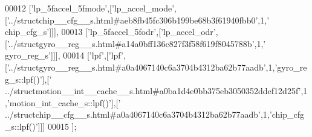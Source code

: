 \begin{DoxyCode}
00012   [\textcolor{stringliteral}{'lp\_5faccel\_5fmode'},[\textcolor{stringliteral}{'lp\_accel\_mode'},[\textcolor{stringliteral}{'../structchip\_\_cfg\_\_s.html#aeb8fb45fc306b199be68b3f61940fbb0'},1,\textcolor{stringliteral}{'
      chip\_cfg\_s'}]]],
00013   [\textcolor{stringliteral}{'lp\_5faccel\_5fodr'},[\textcolor{stringliteral}{'lp\_accel\_odr'},[\textcolor{stringliteral}{'../structgyro\_\_reg\_\_s.html#a14a0bff136c827f3f58f619f8045788b'},1,\textcolor{stringliteral}{'
      gyro\_reg\_s'}]]],
00014   [\textcolor{stringliteral}{'lpf'},[\textcolor{stringliteral}{'lpf'},[\textcolor{stringliteral}{'../structgyro\_\_reg\_\_s.html#a0a4067140c6a3704b4312ba62b77aadb'},1,\textcolor{stringliteral}{'gyro\_reg\_s::lpf()'}],[\textcolor{stringliteral}{'
      ../structmotion\_\_int\_\_cache\_\_s.html#a0ba1d4e0bb375eb3050352ddef12d25f'},1,\textcolor{stringliteral}{'motion\_int\_cache\_s::lpf()'}],[\textcolor{stringliteral}{'
      ../structchip\_\_cfg\_\_s.html#a0a4067140c6a3704b4312ba62b77aadb'},1,\textcolor{stringliteral}{'chip\_cfg\_s::lpf()'}]]]
00015 ];
\end{DoxyCode}
